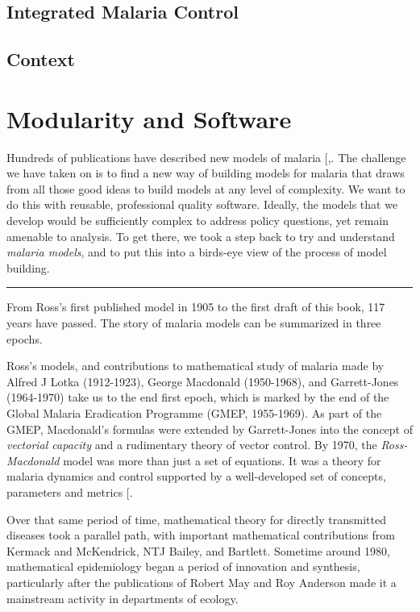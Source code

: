 \documentclass[
]{book}
\begin{document}
\section{Integrated Malaria Control}\label{integrated-malaria-control}

\section{Context}\label{context}

\chapter{Modularity and Software}\label{modularity-and-software}

Hundreds of publications have described new models of malaria {[},\citeproc{ref-SmithNR2018AgentbasedModels}{4}{]}. The challenge we have taken on is to find a new way of building models for malaria that draws from all those good ideas to build models at any level of complexity. We want to do this with reusable, professional quality software. Ideally, the models that we develop would be sufficiently complex to address policy questions, yet remain amenable to analysis. To get there, we took a step back to try and understand \emph{malaria models}, and to put this into a birds-eye view of the process of model building.

\begin{center}\rule{0.5\linewidth}{0.5pt}\end{center}

From Ross's first published model in 1905 to the first draft of this book, 117 years have passed. The story of malaria models can be summarized in three epochs.

Ross's models, and contributions to mathematical study of malaria made by Alfred J Lotka (1912-1923), George Macdonald (1950-1968), and Garrett-Jones (1964-1970) take us to the end first epoch, which is marked by the end of the Global Malaria Eradication Programme (GMEP, 1955-1969). As part of the GMEP, Macdonald's formulas were extended by Garrett-Jones into the concept of \emph{vectorial capacity} and a rudimentary theory of vector control. By 1970, the \emph{Ross-Macdonald} model was more than just a set of equations. It was a theory for malaria dynamics and control supported by a well-developed set of concepts, parameters and metrics {[}\citeproc{ref-SmithDL2012_RossMacdonald}{2}{]}.

Over that same period of time, mathematical theory for directly transmitted diseases took a parallel path, with important mathematical contributions from Kermack and McKendrick, NTJ Bailey, and Bartlett. Sometime around 1980, mathematical epidemiology began a period of innovation and synthesis, particularly after the publications of Robert May and Roy Anderson made it a mainstream activity in departments of ecology.
\end{document}
